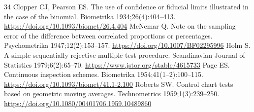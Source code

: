 \documentclass[a4paper,fleqn,doubleblind]{cas-dc}
\begin{document}
\begin{thebibliography}{34}
 Clopper CJ, Pearson ES. The use of confidence or fiducial limits illustrated in the case of the binomial. Biometrika 1934;26(4):404--413. \url{https://doi.org/10.1093/biomet/26.4.404}
 McNemar Q. Note on the sampling error of the difference between correlated proportions or percentages. Psychometrika 1947;12(2):153--157. \url{https://doi.org/10.1007/BF02295996}
 Holm S. A simple sequentially rejective multiple test procedure. Scandinavian Journal of Statistics 1979;6(2):65--70. \url{https://www.jstor.org/stable/4615733}
 Page ES. Continuous inspection schemes. Biometrika 1954;41(1--2):100--115. \url{https://doi.org/10.1093/biomet/41.1-2.100}
 Roberts SW. Control chart tests based on geometric moving averages. Technometrics 1959;1(3):239--250. \url{https://doi.org/10.1080/00401706.1959.10489860}
\end{thebibliography}
\end{document}
